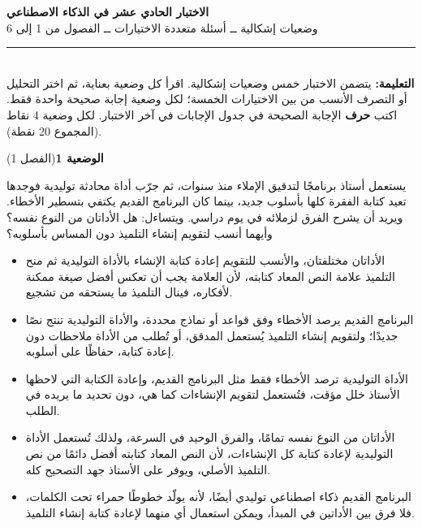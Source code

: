 \documentclass[11pt,a4paper]{article}
\begin{document}
\linespread{1.08}\selectfont
\begin{center}
{\LARGE\khatt\textbf{الاختبار الحادي عشر في الذكاء الاصطناعي}}\\[4pt]
{\normalsize وضعيات إشكالية ــ أسئلة متعددة الاختيارات ــ الفصول من 1 إلى 6}
\end{center}
\vspace{-2pt}\rule{\textwidth}{0.6pt}\\[2pt]
\textbf{التعليمة:} يتضمن الاختبار خمس وضعيات إشكالية. اقرأ كل وضعية بعناية، ثم اختر التحليل أو التصرف الأنسب
من بين الاختيارات الخمسة؛ لكل وضعية إجابة صحيحة واحدة فقط.
اكتب \textbf{حرف} الإجابة الصحيحة في جدول الإجابات في آخر الاختبار.
لكل وضعية 4 نقاط (المجموع 20 نقطة).
\vspace{4pt}

\noindent
{\large\khatt\textbf{الوضعية 1}}\hfill{\small(الفصل 1)}\par\nopagebreak\vspace{3pt}
\setlength{\fboxsep}{7pt}\colorbox{gray!10}{\parbox{\dimexpr\linewidth-14pt}{يستعمل أستاذ برنامجًا لتدقيق الإملاء منذ سنوات، ثم جرّب أداة محادثة توليدية فوجدها تعيد كتابة الفقرة كلها بأسلوب جديد، بينما كان البرنامج القديم يكتفي بتسطير الأخطاء. ويريد أن يشرح الفرق لزملائه في يوم دراسي. ويتساءل: هل الأداتان من النوع نفسه؟ وأيهما أنسب لتقويم إنشاء التلميذ دون المساس بأسلوبه؟}}\par\nopagebreak
\begin{itemize}[leftmargin=1.0cm, labelsep=6pt, itemsep=3pt, topsep=4pt, parsep=0pt]
  \item[\textbf{أ)}] الأداتان مختلفتان، والأنسب للتقويم إعادة كتابة الإنشاء بالأداة التوليدية ثم منح التلميذ علامة النص المعاد كتابته، لأن العلامة يجب أن تعكس أفضل صيغة ممكنة لأفكاره، فينال التلميذ ما يستحقه من تشجيع.
  \item[\textbf{ب)}] البرنامج القديم يرصد الأخطاء وفق قواعد أو نماذج محددة، والأداة التوليدية تنتج نصًا جديدًا؛ ولتقويم إنشاء التلميذ يُستعمل المدقق، أو تُطلب من الأداة ملاحظات دون إعادة كتابة، حفاظًا على أسلوبه.
  \item[\textbf{ج)}] الأداة التوليدية ترصد الأخطاء فقط مثل البرنامج القديم، وإعادة الكتابة التي لاحظها الأستاذ خلل مؤقت، فتُستعمل لتقويم الإنشاءات كما هي، دون تحديد ما يريده في الطلب.
  \item[\textbf{د)}] الأداتان من النوع نفسه تمامًا، والفرق الوحيد في السرعة، ولذلك تُستعمل الأداة التوليدية لإعادة كتابة كل الإنشاءات، لأن النص المعاد كتابته أفضل دائمًا من نص التلميذ الأصلي، ويوفر على الأستاذ جهد التصحيح كله.
  \item[\textbf{هـ)}] البرنامج القديم ذكاء اصطناعي توليدي أيضًا، لأنه يولّد خطوطًا حمراء تحت الكلمات، فلا فرق بين الأداتين في المبدأ، ويمكن استعمال أي منهما لإعادة كتابة إنشاء التلميذ.
\end{itemize}
\end{document}

